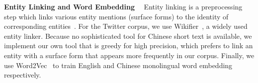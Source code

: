 \textbf{Entity Linking and Word Embedding}~~
Entity linking is a preprocessing step which links various entity mentions (surface forms) to the identity of corresponding entities~\cite{Ren2017CoTypeJE,Pan2017CrosslingualNT}. 
For the Twitter corpus, we use Wikifier~\cite{cheng2013relational,ratinov2011local}, a widely used
entity linker. 
Because no sophisticated tool for Chinese short text is available, 
we implement our own tool that is greedy for high precision, which prefers to link an entity with a surface form that appears more frequently in our corpus. 
%
%
Finally, we use Word2Vec~\cite{Mikolov2013distributed} to train English and Chinese monolingual word embedding respectively.

